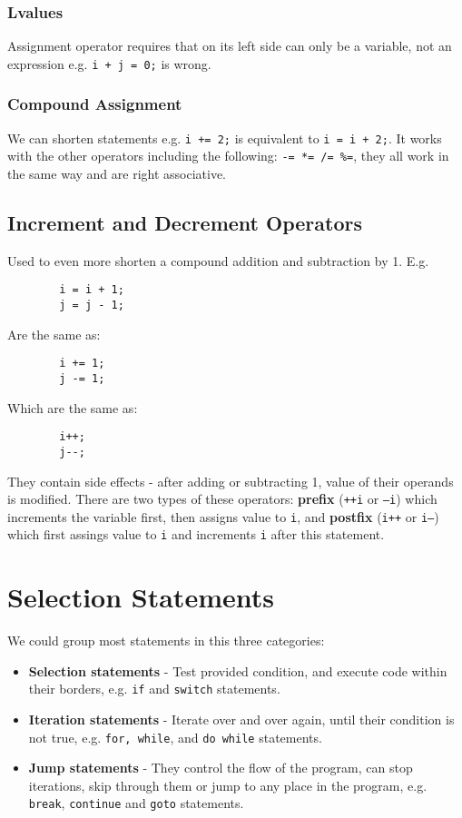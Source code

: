 \documentclass[openany]{book}
\begin{document}
    \subsection*{Lvalues}
    Assignment operator requires that on its left side can only be a variable, not an
    expression e.g. \texttt{i + j = 0;} is wrong.

    \subsection*{Compound Assignment}
    We can shorten statements e.g. \texttt{i += 2;} is equivalent to
    \texttt{i = i + 2;}. It works with the other operators including the following:
    \texttt{-= *= /= \%=}, they all work in the same way and are right associative.

    \section{Increment and Decrement Operators}
    Used to even more shorten a compound addition and subtraction by 1. E.g. 
    \begin{lstlisting}
        i = i + 1;
        j = j - 1;
    \end{lstlisting}
    Are the same as:
    \begin{lstlisting}
        i += 1;
        j -= 1;
    \end{lstlisting}
    Which are the same as:
    \begin{lstlisting}
        i++;
        j--;
    \end{lstlisting}

    They contain side effects - after adding or subtracting 1, value of their operands
    is modified. There are two types of these operators: \textbf{prefix} (\texttt{++i}
    or \texttt{---i}) which increments the variable first, then assigns value to \texttt{i},
    and \textbf{postfix} (\texttt{i++} or \texttt{i---}) which first assings value to
    \texttt{i} and increments \texttt{i} after this statement.

    \chapter{Selection Statements}
    We could group most statements in this three categories:
    \begin{itemize}
        \item \textbf{Selection statements} - Test provided condition, and execute code
        within their borders, e.g. \texttt{if} and \texttt{switch} statements.
        \item \textbf{Iteration statements} - Iterate over and over again, until their
        condition is not true, e.g. \texttt{for, while}, and \texttt{do while} statements.
        \item \textbf{Jump statements} - They control the flow of the program, can stop
        iterations, skip through them or jump to any place in the program, e.g. \texttt{break},
        \texttt{continue} and \texttt{goto} statements.
    \end{itemize} 
\end{document}
